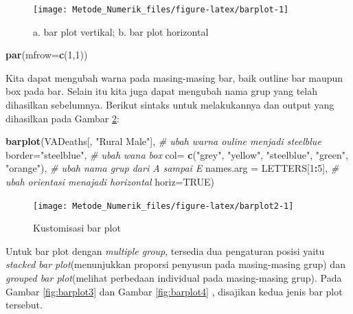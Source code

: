 \documentclass[
]{book}
\newenvironment{Shaded}{\begin{snugshade}}{\end{snugshade}}
\newcommand{\AttributeTok}[1]{\textcolor[rgb]{0.13,0.29,0.53}{#1}}
\newcommand{\CommentTok}[1]{\textcolor[rgb]{0.56,0.35,0.01}{\textit{#1}}}
\newcommand{\ConstantTok}[1]{\textcolor[rgb]{0.56,0.35,0.01}{#1}}
\newcommand{\DecValTok}[1]{\textcolor[rgb]{0.00,0.00,0.81}{#1}}
\newcommand{\FunctionTok}[1]{\textcolor[rgb]{0.13,0.29,0.53}{\textbf{#1}}}
\newcommand{\NormalTok}[1]{#1}
\newcommand{\SpecialCharTok}[1]{\textcolor[rgb]{0.81,0.36,0.00}{\textbf{#1}}}
\newcommand{\StringTok}[1]{\textcolor[rgb]{0.31,0.60,0.02}{#1}}
\theoremstyle{definition}
\theoremstyle{definition}
\theoremstyle{definition}
\theoremstyle{definition}
\theoremstyle{remark}
\begin{document}
\begin{figure}

{\centering \texttt{[image: Metode\_Numerik\_files/figure-latex/barplot-1]} 

}

\caption{a. bar plot vertikal; b. bar plot horizontal}\label{fig:barplot}
\end{figure}

\begin{Shaded}
\begin{Highlighting}[]
\FunctionTok{par}\NormalTok{(}\AttributeTok{mfrow=}\FunctionTok{c}\NormalTok{(}\DecValTok{1}\NormalTok{,}\DecValTok{1}\NormalTok{))}
\end{Highlighting}
\end{Shaded}

Kita dapat mengubah warna pada masing-masing bar, baik outline bar maupun box pada bar. Selain itu kita juga dapat mengubah nama grup yang telah dihasilkan sebelumnya. Berikut sintaks untuk melakukannya dan output yang dihasilkan pada Gambar \ref{fig:barplot2}:

\begin{Shaded}
\begin{Highlighting}[]
\FunctionTok{barplot}\NormalTok{(VADeaths[, }\StringTok{"Rural Male"}\NormalTok{],}
        \CommentTok{\# ubah warna ouline menjadi steelblue}
        \AttributeTok{border=}\StringTok{"steelblue"}\NormalTok{,}
        \CommentTok{\# ubah wana box}
        \AttributeTok{col=} \FunctionTok{c}\NormalTok{(}\StringTok{"grey"}\NormalTok{, }\StringTok{"yellow"}\NormalTok{, }\StringTok{"steelblue"}\NormalTok{, }\StringTok{"green"}\NormalTok{, }\StringTok{"orange"}\NormalTok{),}
        \CommentTok{\# ubah nama grup dari A sampai E}
        \AttributeTok{names.arg =}\NormalTok{ LETTERS[}\DecValTok{1}\SpecialCharTok{:}\DecValTok{5}\NormalTok{],}
        \CommentTok{\# ubah orientasi menajadi horizontal}
        \AttributeTok{horiz=}\ConstantTok{TRUE}\NormalTok{)}
\end{Highlighting}
\end{Shaded}

\begin{figure}

{\centering \texttt{[image: Metode\_Numerik\_files/figure-latex/barplot2-1]} 

}

\caption{Kustomisasi bar plot}\label{fig:barplot2}
\end{figure}

Untuk bar plot dengan \emph{multiple group}, tersedia dua pengaturan posisi yaitu \emph{stacked bar plot}(menunjukkan proporsi penyusun pada masing-masing grup) dan \emph{grouped bar plot}(melihat perbedaan individual pada masing-masing grup). Pada Gambar \ref{fig:barplot3} dan Gambar \ref{fig:barplot4} , disajikan kedua jenis bar plot tersebut.
\end{document}
